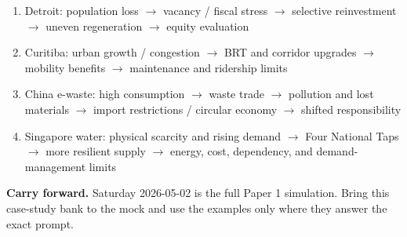 \documentclass[11pt,a4paper]{article}
\newcommand{\boxnote}[3]{%
\noindent\colorbox{#1}{%
  \begin{minipage}{0.965\textwidth}
  \sffamily
  \textbf{\textcolor{HeadingBlue}{#2}} #3
  \end{minipage}
}}
\begin{document}
\begin{enumerate}
  \item Detroit: population loss $\rightarrow$ vacancy / fiscal stress
  $\rightarrow$ selective reinvestment $\rightarrow$ uneven regeneration
  $\rightarrow$ equity evaluation
  \item Curitiba: urban growth / congestion $\rightarrow$ BRT and corridor
  upgrades $\rightarrow$ mobility benefits $\rightarrow$ maintenance and
  ridership limits
  \item China e-waste: high consumption $\rightarrow$ waste trade
  $\rightarrow$ pollution and lost materials $\rightarrow$ import restrictions
  / circular economy $\rightarrow$ shifted responsibility
  \item Singapore water: physical scarcity and rising demand $\rightarrow$
  Four National Taps $\rightarrow$ more resilient supply $\rightarrow$ energy,
  cost, dependency, and demand-management limits
\end{enumerate}

\boxnote{SoftTint}{Carry forward.}{Saturday 2026-05-02 is the full Paper 1
simulation. Bring this case-study bank to the mock and use the examples only
where they answer the exact prompt.}
\end{document}
